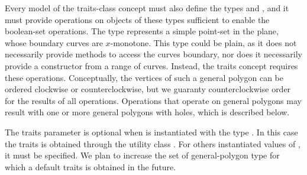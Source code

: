 Every model of the traits-class concept must also define the types
 and , and it
must provide operations on objects of these types sufficient to enable
the boolean-set operations.  The type  represents a
simple point-set in the plane, whose boundary curves are $x$-monotone.
This type could be plain, as it does not necessarily provide methods
to access the curves boundary, nor does it necessarily provide a
constructor from a range of curves. Instead, the traits concept
requires these operations. Conceptually, the vertices of such a
general polygon can be ordered clockwise or counterclockwise, but we
guaranty counterclockwise order for the results of all
operations. Operations that operate on general polygons may result
with one or more general polygons with holes, which is described
below.

The traits parameter is optional when 
is instantiated with the type . In this case the
traits is obtained through the utility class
. For others
instantiated values of , it must be specified.
We plan to increase the set of general-polygon type for which a default
traits is obtained in the future.


